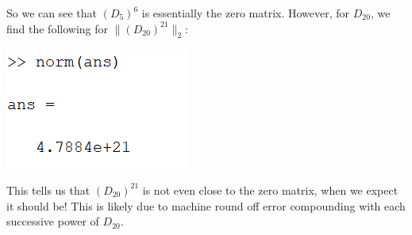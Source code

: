 \documentclass{article}
\begin{document}
So we can see that $(D_5)^6$ is essentially the zero matrix. However, for $D_{20}$, we find the following for $\|(D_{20})^{21}\|_2$:
\begin{center}
    \includegraphics[scale = 0.9]{6_8_cheb20_sv}
\end{center}
This tells us that $(D_{20})^{21}$ is not even close to the zero matrix, when we expect it should be! This is likely due to machine round off error compounding with each successive power of $D_{20}$.
\end{document}
